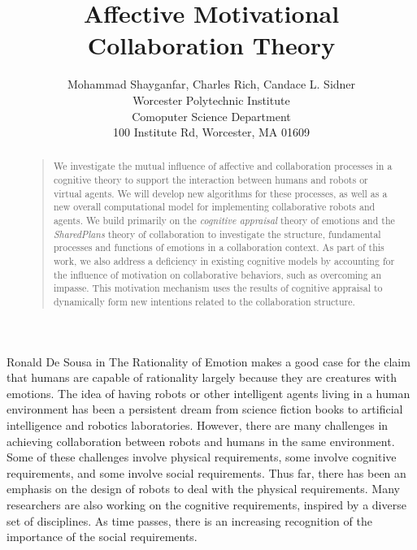 \documentclass[letterpaper]{article}
\begin{document}
%
\title{Affective Motivational Collaboration Theory}
\author{Mohammad Shayganfar, Charles Rich, Candace L. Sidner\\
Worcester Polytechnic Institute\\
Comoputer Science Department\\
100 Institute Rd, Worcester, MA 01609\\
}
\maketitle
\begin{abstract}
\begin{quote}
We investigate the mutual influence of affective and collaboration processes in
a cognitive theory to support the interaction between humans and robots or
virtual agents. We will develop new algorithms for these processes, as well as a
new overall computational model for implementing collaborative robots and
agents. We build primarily on the \textit{cognitive appraisal} theory of
emotions \cite{gratch:domain-independent} and the \textit{SharedPlans} theory
\cite{grosz:plans-discourse} of collaboration to investigate the structure,
fundamental processes and functions of emotions in a collaboration context. As
part of this work, we also address a deficiency in existing cognitive models by
accounting for the influence of motivation on collaborative behaviors, such as
overcoming an impasse. This motivation mechanism uses the results of cognitive
appraisal to dynamically form new intentions related to the collaboration
structure.
\end{quote}
\end{abstract}

\noindent Ronald De Sousa in The Rationality of Emotion
\cite{sousa:rationality-emotion} makes a good case for the claim that humans are
capable of rationality largely because they are creatures with emotions. The
idea of having robots or other intelligent agents living in a human environment
has been a persistent dream from science fiction books to artificial
intelligence and robotics laboratories. However, there are many challenges in
achieving collaboration between robots and humans in the same environment. Some
of these challenges involve physical requirements, some involve cognitive
requirements, and some involve social requirements. Thus far, there has been an
emphasis on the design of robots to deal with the physical requirements. Many
researchers are also working on the cognitive requirements, inspired by a
diverse set of disciplines. As time passes, there is an increasing recognition
of the importance of the social requirements.
\end{document}
